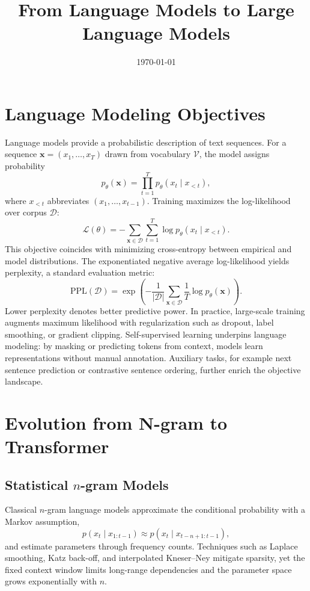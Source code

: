\documentclass{article}
\title{From Language Models to Large Language Models}
\author{}
\date{\today}
\begin{document}
\maketitle

\section{Language Modeling Objectives}
Language models provide a probabilistic description of text sequences. For a sequence $\mathbf{x} = (x_1, \ldots, x_T)$ drawn from vocabulary $\mathcal{V}$, the model assigns probability
\begin{equation}
  p_{\theta}(\mathbf{x}) = \prod_{t=1}^{T} p_{\theta}(x_t \mid x_{<t}),
\end{equation}
where $x_{<t}$ abbreviates $(x_1, \ldots, x_{t-1})$. Training maximizes the log-likelihood over corpus $\mathcal{D}$:
\begin{equation}
  \mathcal{L}(\theta) = - \sum_{\mathbf{x} \in \mathcal{D}} \sum_{t=1}^{T} \log p_{\theta}(x_t \mid x_{<t}).
\end{equation}
This objective coincides with minimizing cross-entropy between empirical and model distributions. The exponentiated negative average log-likelihood yields perplexity, a standard evaluation metric:
\begin{equation}
  \mathrm{PPL}(\mathcal{D}) = \exp\left( - \frac{1}{|\mathcal{D}|} \sum_{\mathbf{x} \in \mathcal{D}} \frac{1}{T} \log p_{\theta}(\mathbf{x}) \right).
\end{equation}
Lower perplexity denotes better predictive power. In practice, large-scale training augments maximum likelihood with regularization such as dropout, label smoothing, or gradient clipping. Self-supervised learning underpins language modeling: by masking or predicting tokens from context, models learn representations without manual annotation. Auxiliary tasks, for example next sentence prediction or contrastive sentence ordering, further enrich the objective landscape.

\section{Evolution from N-gram to Transformer}
\subsection{Statistical $n$-gram Models}
Classical $n$-gram language models approximate the conditional probability with a Markov assumption,
\begin{equation}
  p(x_t \mid x_{1:t-1}) \approx p(x_t \mid x_{t-n+1:t-1}),
\end{equation}
and estimate parameters through frequency counts. Techniques such as Laplace smoothing, Katz back-off, and interpolated Kneser--Ney mitigate sparsity, yet the fixed context window limits long-range dependencies and the parameter space grows exponentially with $n$.
\end{document}

